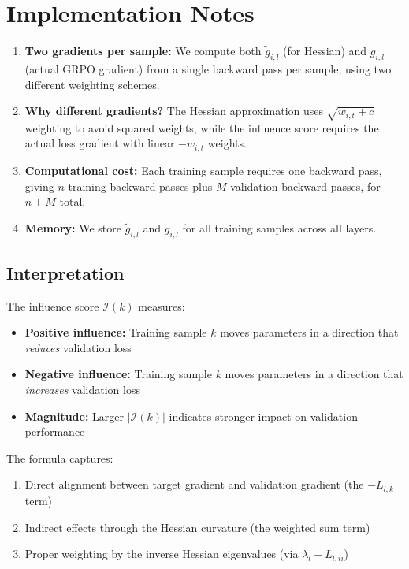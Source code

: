 \documentclass{article}
\begin{document}
\section{Implementation Notes}

\begin{enumerate}
    \item \textbf{Two gradients per sample:} We compute both $\tilde{g}_{i,l}$ (for Hessian) and $g_{i,l}$ (actual GRPO gradient) from a single backward pass per sample, using two different weighting schemes.

    \item \textbf{Why different gradients?} The Hessian approximation uses $\sqrt{w_{i,t}+c}$ weighting to avoid squared weights, while the influence score requires the actual loss gradient with linear $-w_{i,t}$ weights.

    \item \textbf{Computational cost:} Each training sample requires one backward pass, giving $n$ training backward passes plus $M$ validation backward passes, for $n + M$ total.

    \item \textbf{Memory:} We store $\tilde{g}_{i,l}$ and $g_{i,l}$ for all training samples across all layers.
\end{enumerate}


\subsection{Interpretation}

The influence score $\mathcal{I}(k)$ measures:

\begin{itemize}
    \item \textbf{Positive influence:} Training sample $k$ moves parameters in a direction that \emph{reduces} validation loss
    \item \textbf{Negative influence:} Training sample $k$ moves parameters in a direction that \emph{increases} validation loss
    \item \textbf{Magnitude:} Larger $|\mathcal{I}(k)|$ indicates stronger impact on validation performance
\end{itemize}

The formula captures:
\begin{enumerate}
    \item Direct alignment between target gradient and validation gradient (the $-L_{l,k}$ term)
    \item Indirect effects through the Hessian curvature (the weighted sum term)
    \item Proper weighting by the inverse Hessian eigenvalues (via $\lambda_l + L_{l,ii}$)
\end{enumerate}
\end{document}
